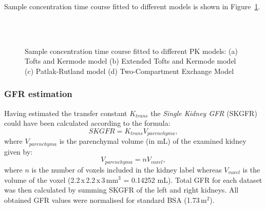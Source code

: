 Sample concentration time course fitted to different models is shown in Figure~\ref{fig:fit}. 

\begin{figure}
\captionsetup[subfloat]{captionskip=0.5cm}
	\centering
	\subfloat[TK model fit; $K_{trans}$ = 0.52 min$^{-1}$ ]{\texttt{[image: tk2]}}\hspace{0.03\linewidth}
	\\ \vspace{0.5cm}	
	\subfloat[PR model fit; $K_{trans}$ = 0.19 min$^{-1}$]{\texttt{[image: pr2]}}\hspace{0.03\linewidth}
	\\	
\vspace{0.5cm}
\caption[An example of models fit]{Sample concentration time course fitted to different PK models: (a) Tofts and Kermode model (b) Extended Tofts and Kermode model (c) Patlak-Rutland model (d) Two-Compartment Exchange Model}
\label{fig:fit}
\end{figure}

\subsubsection{GFR estimation}
Having estimated the transfer constant $K_{trans}$ the \textit{Single Kidney GFR} (SKGFR) could have been calculated according to the formula:
\begin{equation}
SKGFR = K_{trans}V_{parenchyma},
\end{equation}
where $V_{parenchyma}$ is the parenchymal volume (in mL) of the examined kidney given by:
\begin{equation}
V_{parenchyma} = nV_{voxel},
\end{equation}
where $n$ is the number of voxels included in the kidney label whereas $V_{voxel}$ is the volume of the voxel (2.2\,x\,2.2\,x\,3\,mm$^3$ = 0.14252 mL). Total GFR for each dataset was then calculated by summing SKGFR of the left and right kidneys. All obtained GFR values were normalised for standard BSA (1.73\,m$^2$).
